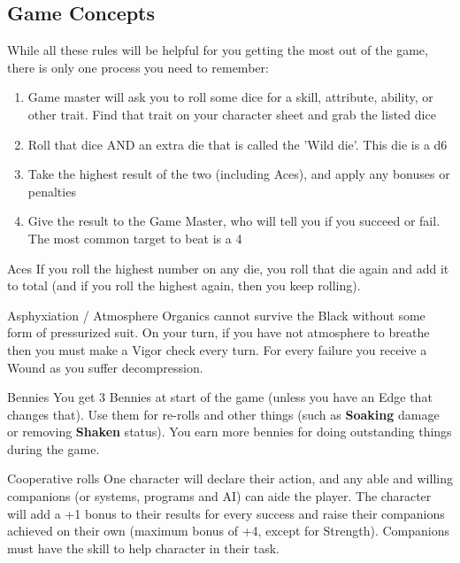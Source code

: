 \subsection{Game Concepts}
\label{sec:rules-concepts}

While all these rules will be helpful for you getting the most out of the game, there is only one process you need to remember:

\begin{enumerate}
  \item Game master will ask you to roll some dice for a skill, attribute, ability, or other trait. Find that trait on your character sheet and grab the listed dice
  \item Roll that dice AND an extra die that is called the 'Wild die'. This die is a d6
  \item Take the highest result of the two (including Aces), and apply any bonuses or penalties
  \item Give the result to the Game Master, who will tell you if you succeed or fail. The most common target to beat is a 4
\end{enumerate}

\begin{genericsection}{Aces}
If you roll the highest number on any die, you roll that die again and add it to total (and if you roll the highest again, then you keep rolling).
\end{genericsection}

\begin{genericsection}{Asphyxiation / Atmosphere}
Organics cannot survive the Black without some form of pressurized suit. On your turn, if you have not atmosphere to breathe then you must make a Vigor check every turn. For every failure you receive a Wound as you suffer decompression.
\end{genericsection}

\begin{genericsection}{Bennies}
You get 3 Bennies at start of the game (unless you have an Edge that changes that). Use them for re-rolls and other things (such as \textbf{Soaking} damage or removing \textbf{Shaken} status). You earn more bennies for doing outstanding things during the game.
\end{genericsection}

\begin{genericsection}{Cooperative rolls}
One character will declare their action, and any able and willing companions (or systems, programs and AI) can aide the player. The character will add a +1 bonus to their results for every success and raise their companions achieved on their own (maximum bonus of +4, except for Strength). Companions must have the skill to help character in their task.
\end{genericsection}


